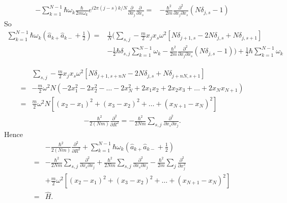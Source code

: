 \begin{enumerate}
    
    \begin{align*}
        -\sum_{k=1}^{N-1}
        \hbar\omega_k 
        \frac{\hbar}{2m\omega_k}
        e^{i2\pi (j-s)k/N}
        \frac{\partial}{\partial x_j}\frac{\partial}{\partial x_s}
        =&
        -\frac{\hbar^2}{2m}\frac{\partial^2}{\partial x_j\partial x_s}(N\delta_{j,s}-1)
    \end{align*}
    So 
    \begin{align*}
        \sum_{k=1}^{N-1}\hbar\omega_k(\hat a_{k+}\hat a_{k-} + \frac{1}{2} )
        = & \frac{1}{N}\bigg(\sum_{s,j}
        -\frac{m}{2}
        x_jx_s 
        \omega^2
        \left[
        N\delta_{j+1,s} 
        -2N\delta_{j,s} 
        +N\delta_{j,s+1} 
        \right]\\
         & -\frac{1}{2}\hbar\delta_{s,j}\sum_{k=1}^{N-1}\omega_k
        -\frac{\hbar^2}{2m}\frac{\partial^2}{\partial x_j\partial x_s}(N\delta_{j,s}-1)
        \bigg) + \frac{1}{2}\hbar\sum_{k=1}^{N-1}\omega_k
    \end{align*}

    \begin{align*}
        & \sum_{s,j}
        -\frac{m}{2}
        x_jx_s 
        \omega^2
        \left[
        N\delta_{j+1,s+nN} 
        -2N\delta_{j,s} 
        +N\delta_{j+nN,s+1} 
        \right] \\
        = & 
        - \frac{m}{2}\omega^2N 
        (-2x_1^2-2x_2^2-\dots-2x_N^2 + 2x_1x_2 + 2x_2x_3 + \dots +2 x_{N}x_{N+1})\\
        =& \frac{m}{2}\omega^2N[(x_2-x_1)^2 + (x_3-x_2)^2 + \dots + (x_{N+1}-x_{N})^2]
    \end{align*}
    \begin{align*}
        -\frac{\hbar^2}{2(Nm)}\frac{\partial^2}{\partial R^2}
        =-\frac{\hbar^2}{2Nm}\sum_{s,j}\frac{\partial^2}{\partial x_s\partial x_j}.
    \end{align*}
    Hence 
    \begin{align*}
        &-\frac{\hbar^2}{2(Nm)}\frac{\partial^2}{\partial R^2} + \sum_{k=1}^{N-1}
        \hbar \omega_k(\hat a_{k+}\hat a_{k-} + \frac{1}{2})\\
        =& 
        -\frac{\hbar^2}{2Nm}\sum_{s,j}\frac{\partial^2}{\partial x_s\partial x_j}
        +\frac{\hbar^2}{2Nm}\sum_{s,j}\frac{\partial^2}{\partial x_s\partial x_j} 
        -\frac{\hbar^2}{2m}\sum_{j}\frac{\partial^2}{\partial x_j^2}\\
         &+ \frac{m}{2}\omega^2[(x_2-x_1)^2 + (x_3-x_2)^2 + \dots + (x_{N+1}-x_{N})^2]\\
         =& \hat H.
    \end{align*}

   

       
   \end{enumerate}
